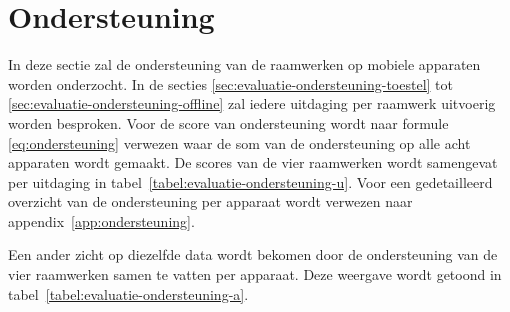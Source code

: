 \section{Ondersteuning}
\label{sec:evaluatie-ondersteuning}

In deze sectie zal de ondersteuning van de raamwerken op mobiele apparaten worden onderzocht.
In de secties \ref{sec:evaluatie-ondersteuning-toestel} tot \ref{sec:evaluatie-ondersteuning-offline} zal iedere uitdaging per raamwerk uitvoerig worden besproken.
Voor de score van ondersteuning wordt naar formule \ref{eq:ondersteuning} verwezen waar de som van de ondersteuning op alle acht apparaten wordt gemaakt.
De scores van de vier raamwerken wordt samengevat per uitdaging in tabel~\ref{tabel:evaluatie-ondersteuning-u}.
Voor een gedetailleerd overzicht van de ondersteuning per apparaat wordt verwezen naar appendix~\ref{app:ondersteuning}.

\begin{table}
\centering
\resizebox{14cm}{!} {
}
\caption{Ondersteuning per uitdaging.}
\label{tabel:evaluatie-ondersteuning-u}
\end{table}

Een ander zicht op diezelfde data wordt bekomen door de ondersteuning van de vier raamwerken samen te vatten per apparaat.
Deze weergave wordt getoond in tabel~\ref{tabel:evaluatie-ondersteuning-a}.


